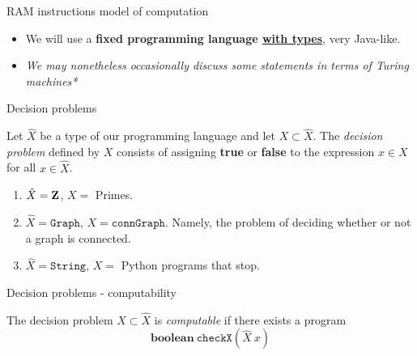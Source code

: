 %

\begin{frame}{RAM instructions model of computation}
	\begin{itemize}
		\item We will use a \textbf{fixed programming language \underline{with types}},
			very Java-like.
		\item[] {\scriptsize \it *We may nonetheless occasionally discuss some statements
			in terms of Turing machines*}
	\end{itemize}
\end{frame}

%

\begin{frame}{Decision problems}
	\begin{defn}
		Let $\hat{X}$ be a type of our programming language and let $X \subset \hat{X}$. The
		\emph{decision problem} defined by $X$ consists of assigning \textbf{true} or 
		\textbf{false} to the expression $x \in X$ for all $x \in \hat{X}$. 
	\end{defn}

	\begin{exl}
		\begin{enumerate}
			\item $\hat{X}= \mathbf{Z}$, $X=$ Primes.
			\item $\hat{X}= \mathtt{Graph}$, $X= \mathtt{connGraph}$. Namely, the
				problem of deciding whether or not a graph is connected.
			\item $\hat{X}= \mathtt{String}$, $X=$ Python programs that stop.
		\end{enumerate}
	\end{exl}
\end{frame}

%

\begin{frame}{Decision problems - computability}
	\begin{defn}
		The decision problem $X \subset \hat{X}$ is \emph{computable} if there exists
		a program
		\[
			\mathbf{boolean}\ \mathtt{checkX}(\hat{X}\ x)
		\]
	\end{defn}
\end{frame}

